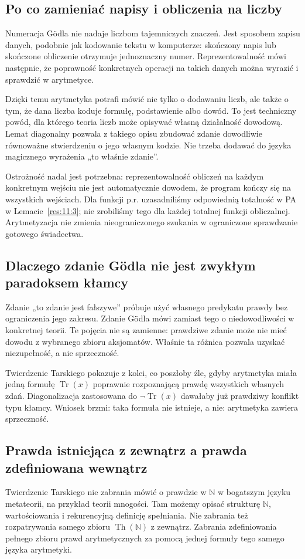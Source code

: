 \documentclass[11pt,a4paper]{article}
\numberwithin{equation}{section}
\theoremstyle{plain}
\theoremstyle{definition}
\theoremstyle{remark}
\begin{document}
\subsection*{Po co zamieniać napisy i obliczenia na liczby}\label{sec:18:1}
Numeracja Gödla nie nadaje liczbom tajemniczych znaczeń. Jest sposobem zapisu danych, podobnie jak kodowanie tekstu w komputerze: skończony napis lub skończone obliczenie otrzymuje jednoznaczny numer. Reprezentowalność mówi następnie, że poprawność konkretnych operacji na takich danych można wyrazić i sprawdzić w arytmetyce.

Dzięki temu arytmetyka potrafi mówić nie tylko o dodawaniu liczb, ale także o tym, że dana liczba koduje formułę, podstawienie albo dowód. To jest techniczny powód, dla którego teoria liczb może opisywać własną działalność dowodową. Lemat diagonalny pozwala z takiego opisu zbudować zdanie dowodliwie równoważne stwierdzeniu o jego własnym kodzie. Nie trzeba dodawać do języka magicznego wyrażenia „to właśnie zdanie”.

Ostrożność nadal jest potrzebna: reprezentowalność obliczeń na każdym konkretnym wejściu nie jest automatycznie dowodem, że program kończy się na wszystkich wejściach. Dla funkcji p.r. uzasadniliśmy odpowiednią totalność w PA w Lemacie~\ref{res:11:3}; nie zrobiliśmy tego dla każdej totalnej funkcji obliczalnej. Arytmetyzacja nie zmienia nieograniczonego szukania w ograniczone sprawdzanie gotowego świadectwa.

\subsection*{Dlaczego zdanie Gödla nie jest zwykłym paradoksem kłamcy}\label{sec:18:2}
Zdanie „to zdanie jest fałszywe” próbuje użyć własnego predykatu prawdy bez ograniczenia jego zakresu. Zdanie Gödla mówi zamiast tego o niedowodliwości w konkretnej teorii. Te pojęcia nie są zamienne: prawdziwe zdanie może nie mieć dowodu z wybranego zbioru aksjomatów. Właśnie ta różnica pozwala uzyskać niezupełność, a nie sprzeczność.

Twierdzenie Tarskiego pokazuje z kolei, co poszłoby źle, gdyby arytmetyka miała jedną formułę $\operatorname{Tr}(x)$ poprawnie rozpoznającą prawdę wszystkich własnych zdań. Diagonalizacja zastosowana do $\neg\operatorname{Tr}(x)$ dawałaby już prawdziwy konflikt typu kłamcy. Wniosek brzmi: taka formuła nie istnieje, a nie: arytmetyka zawiera sprzeczność.

\subsection*{Prawda istniejąca z zewnątrz a prawda zdefiniowana wewnątrz}\label{sec:18:3}
Twierdzenie Tarskiego nie zabrania mówić o prawdzie w $\mathbb N$ w bogatszym języku metateorii, na przykład teorii mnogości. Tam możemy opisać strukturę $\mathbb N$, wartościowania i rekurencyjną definicję spełniania. Nie zabrania też rozpatrywania samego zbioru $\operatorname{Th}(\mathbb N)$ z zewnątrz. Zabrania zdefiniowania pełnego zbioru prawd arytmetycznych za pomocą jednej formuły tego samego języka arytmetyki.
\end{document}
